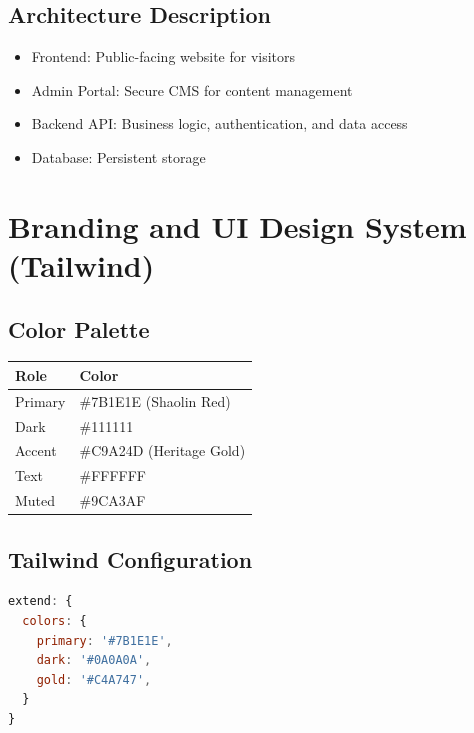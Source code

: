 \documentclass[12pt,a4paper]{article}
\begin{document}
\subsection*{Architecture Description}
\begin{itemize}
    \item Frontend: Public-facing website for visitors
    \item Admin Portal: Secure CMS for content management
    \item Backend API: Business logic, authentication, and data access
    \item Database: Persistent storage
\end{itemize}

\section{Branding and UI Design System (Tailwind)}

\subsection{Color Palette}

\begin{center}
\begin{tabular}{ll}
\toprule
Role & Color \\
\midrule
Primary & \#7B1E1E (Shaolin Red) \\
Dark & \#111111 \\
Accent & \#C9A24D (Heritage Gold) \\
Text & \#FFFFFF \\
Muted & \#9CA3AF \\
\bottomrule
\end{tabular}
\end{center}

\subsection{Tailwind Configuration}
\begin{lstlisting}[language=JavaScript]
extend: {
  colors: {
    primary: '#7B1E1E',
    dark: '#0A0A0A',
    gold: '#C4A747',
  }
}
\end{lstlisting}
\end{document}

